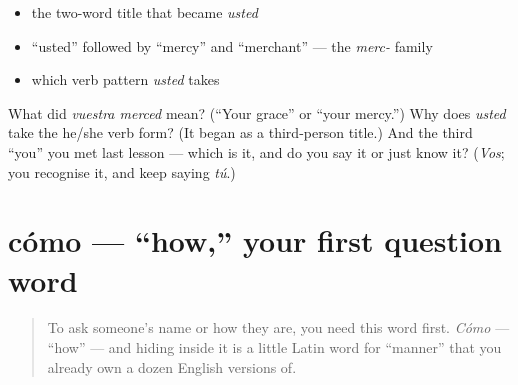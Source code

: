 \begin{itemize}
\raggedright
  \item the two-word title that became \emph{usted}
  \item \textquotedblleft{}usted\textquotedblright{} followed by \textquotedblleft{}mercy\textquotedblright{} and \textquotedblleft{}merchant\textquotedblright{} — the \emph{merc-} family
  \item which verb pattern \emph{usted} takes
\end{itemize}

\begin{tcolorbox}[breakable,colback=teal!4,colframe=teal!35!black,title={Before you move on}]
What did \emph{vuestra merced} mean? (\textquotedblleft{}Your grace\textquotedblright{} or \textquotedblleft{}your mercy.\textquotedblright{}) Why does \emph{usted} take the he/she verb form? (It began as a third-person title.) And the third \textquotedblleft{}you\textquotedblright{} you met last lesson — which is it, and do you say it or just know it? (\emph{Vos}; you recognise it, and keep saying \emph{tú}.)
\end{tcolorbox}
\section[cómo]{cómo — \textquotedblleft{}how,\textquotedblright{} your first question word}

\label{lesson:ES-C03-como}



\begin{quote}
To ask someone's name or how they are, you need this word first. \emph{Cómo} — \textquotedblleft{}how\textquotedblright{} — and hiding inside it is a little Latin word for \textquotedblleft{}manner\textquotedblright{} that you already own a dozen English versions of.
\end{quote}

